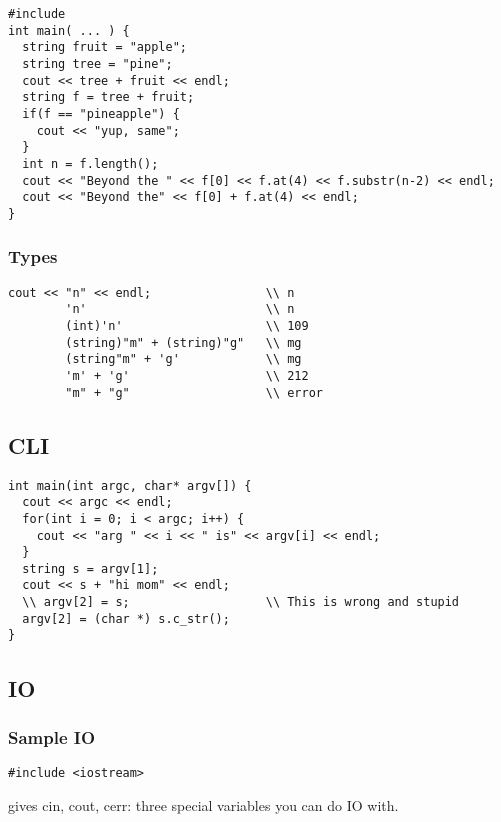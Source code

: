 \documentclass[12pt]{article}
\begin{document}
\begin{verbatim}
#include 
int main( ... ) {
  string fruit = "apple";
  string tree = "pine";
  cout << tree + fruit << endl;
  string f = tree + fruit;
  if(f == "pineapple") {
    cout << "yup, same";
  }
  int n = f.length();
  cout << "Beyond the " << f[0] << f.at(4) << f.substr(n-2) << endl;
  cout << "Beyond the" << f[0] + f.at(4) << endl;
}
\end{verbatim}

\subsubsection*{Types}
\begin{verbatim}
cout << "n" << endl;                \\ n
        'n'                         \\ n
        (int)'n'                    \\ 109
        (string)"m" + (string)"g"   \\ mg
        (string"m" + 'g'            \\ mg
        'm' + 'g'                   \\ 212
        "m" + "g"                   \\ error
\end{verbatim}

\subsection*{CLI}
\begin{verbatim}
int main(int argc, char* argv[]) {
  cout << argc << endl;
  for(int i = 0; i < argc; i++) {
    cout << "arg " << i << " is" << argv[i] << endl;
  }
  string s = argv[1];
  cout << s + "hi mom" << endl;
  \\ argv[2] = s;                   \\ This is wrong and stupid
  argv[2] = (char *) s.c_str();
}
\end{verbatim}

\subsection*{IO}
\subsubsection*{Sample IO}
\begin{verbatim}
#include <iostream>
\end{verbatim}
gives cin, cout, cerr: three special variables you can do IO with.
\end{document}
